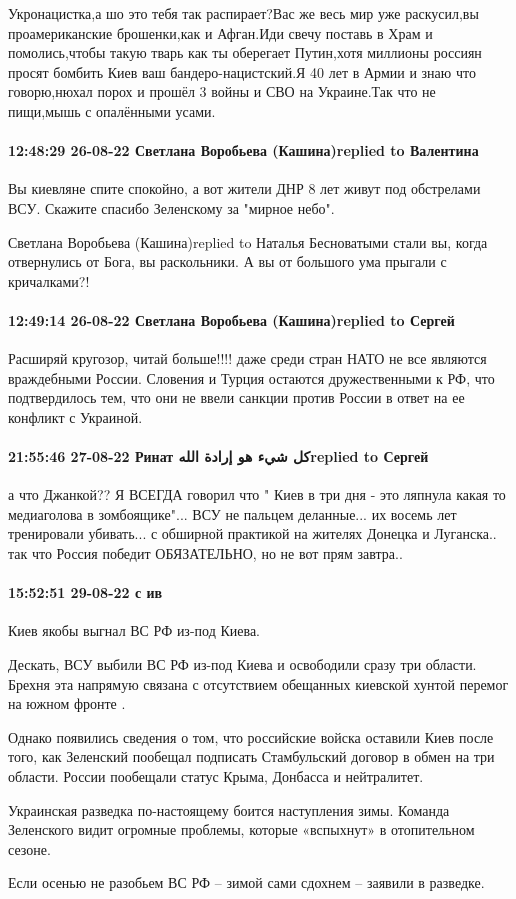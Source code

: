 Укронацистка,а шо это тебя так распирает?Вас же весь мир уже раскусил,вы
проамериканские брошенки,как и Афган.Иди свечу поставь в Храм и помолись,чтобы
такую тварь как ты оберегает Путин,хотя миллионы россиян просят бомбить Киев
ваш бандеро-нацистский.Я 40 лет в Армии и знаю что говорю,нюхал порох и прошёл
3 войны и СВО на Украине.Так что не пищи,мышь с опалёнными усами.


\paragraph{12:48:29 26-08-22 Светлана Воробьева (Кашина)replied to Валентина}

Вы киевляне спите спокойно, а вот жители ДНР 8 лет живут под обстрелами ВСУ.
Скажите спасибо Зеленскому за "мирное небо".

Светлана Воробьева (Кашина)replied to Наталья
Бесноватыми стали вы, когда отвернулись от Бога, вы раскольники. А вы от большого ума прыгали с кричалками?!

\paragraph{12:49:14 26-08-22 Светлана Воробьева (Кашина)replied to Сергей}

Расширяй кругозор, читай больше!!!! даже среди стран НАТО не все являются
враждебными России. Словения и Турция остаются дружественными к РФ, что
подтвердилось тем, что они не ввели санкции против России в ответ на ее
конфликт с Украиной.

\paragraph{21:55:46 27-08-22 Ринат كل شيء هو إرادة اللهreplied to Сергей}

а что Джанкой?? Я ВСЕГДА говорил что " Киев в три дня - это ляпнула какая то
медиаголова в зомбоящике"... ВСУ не пальцем деланные... их восемь лет
тренировали убивать... с обширной практикой на жителях Донецка и Луганска.. так
что Россия победит ОБЯЗАТЕЛЬНО, но не вот прям завтра..

\paragraph{15:52:51 29-08-22 с ив}

Киев якобы выгнал ВС РФ из-под Киева.

Дескать, ВСУ выбили ВС РФ из-под Киева и освободили сразу три области. Брехня
эта напрямую связана с отсутствием обещанных киевской хунтой перемог на южном
фронте .

Однако появились сведения о том, что российские войска оставили Киев после
того, как Зеленский пообещал подписать Стамбульский договор в обмен на три
области. России пообещали статус Крыма, Донбасса и нейтралитет.

Украинская разведка по-настоящему боится наступления зимы. Команда Зеленского
видит огромные проблемы, которые «вспыхнут» в отопительном сезоне.

Если осенью не разобьем ВС РФ – зимой сами сдохнем – заявили в разведке. 
